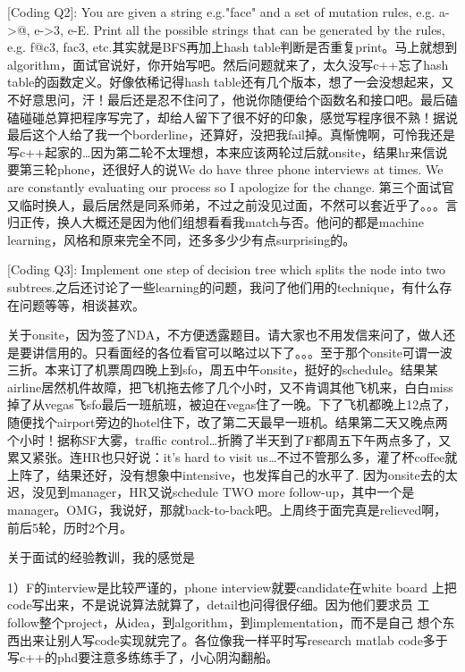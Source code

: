 \documentclass[12pt]{book}
\begin{document}
[Coding Q2]: You are given a string e.g."face" and a set of mutation rules, e.g. a->@, e->3, e-E. Print all the possible strings that can be generated by the rules, e.g. f@c3, fac3, etc.其实就是BFS再加上hash table判断是否重复print。马上就想到algorithm，面试官说好，你开始写吧。然后问题就来了，太久没写c++忘了hash table的函数定义。好像依稀记得hash table还有几个版本，想了一会没想起来，又不好意思问，汗！最后还是忍不住问了，他说你随便给个函数名和接口吧。最后磕磕碰碰总算把程序写完了，却给人留下了很不好的印象，感觉写程序很不熟！据说最后这个人给了我一个borderline，还算好，没把我fail掉。真惭愧啊，可怜我还是写c++起家的\ldots{}因为第二轮不太理想，本来应该两轮过后就onsite，结果hr来信说要第三轮phone，还很好人的说We do have three phone interviews at times. We are constantly evaluating our process so I apologize for the change. 第三个面试官又临时换人，最后居然是同系师弟，不过之前没见过面，不然可以套近乎了。。。言归正传，换人大概还是因为他们组想看看我match与否。他问的都是machine learning，风格和原来完全不同，还多多少少有点surprising的。

[Coding Q3]: Implement one step of decision tree which splits the node into two subtrees.之后还讨论了一些learning的问题，我问了他们用的technique，有什么存在问题等等，相谈甚欢。

关于onsite，因为签了NDA，不方便透露题目。请大家也不用发信来问了，做人还是要讲信用的。只看面经的各位看官可以略过以下了。。。至于那个onsite可谓一波三折。本来订了机票周四晚上到sfo，周五中午onsite，挺好的schedule。结果某airline居然机件故障，把飞机拖去修了几个小时，又不肯调其他飞机来，白白miss掉了从vegas飞sfo最后一班航班，被迫在vegas住了一晚。下了飞机都晚上12点了，随便找个airport旁边的hotel住下，改了第二天最早一班机。结果第二天又晚点两个小时！据称SF大雾，traffic control\ldots{}折腾了半天到了F都周五下午两点多了，又累又紧张。连HR也只好说：it's hard to visit us\ldots{}不过不管那么多，灌了杯coffee就上阵了，结果还好，没有想象中intensive，也发挥自己的水平了. 因为onsite去的太迟，没见到manager，HR又说schedule TWO more follow-up，其中一个是manager。OMG，我说好，那就back-to-back吧。上周终于面完真是relieved啊，前后5轮，历时2个月。

关于面试的经验教训，我的感觉是

1）F的interview是比较严谨的，phone interview就要candidate在white board
上把code写出来，不是说说算法就算了，detail也问得很仔细。因为他们要求员
工follow整个project，从idea，到algorithm，到implementation，而不是自己
想个东西出来让别人写code实现就完了。各位像我一样平时写research matlab
code多于写c++的phd要注意多练练手了，小心阴沟翻船。
\end{document}

